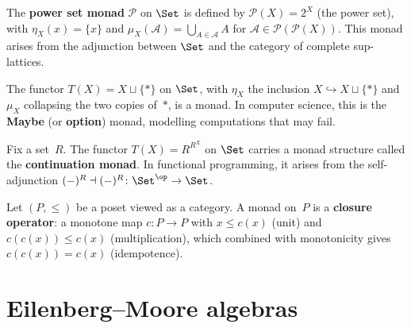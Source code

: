 \begin{example}\label{ex:monad-powerset}
The \textbf{power set monad} $\mathcal{P}$ on $\Set$ is defined by
$\mathcal{P}(X) = 2^X$ (the power set), with
$\eta_X(x) = \{x\}$ and $\mu_X(\mathcal{A}) = \bigcup_{A\in\mathcal{A}} A$
for $\mathcal{A}\in\mathcal{P}(\mathcal{P}(X))$.
This monad arises from the adjunction between $\Set$ and the category
of complete sup-lattices.
\end{example}

\begin{example}\label{ex:monad-maybe}
The functor $T(X) = X\sqcup\{*\}$ on $\Set$, with $\eta_X$ the
inclusion $X\hookrightarrow X\sqcup\{*\}$ and $\mu_X$ collapsing
the two copies of~$*$, is a monad.  In computer science, this is the
\textbf{Maybe} (or \textbf{option}) monad, modelling computations that
may fail.
\end{example}

\begin{example}\label{ex:monad-continuation}
Fix a set~$R$.  The functor $T(X) = R^{R^X}$ on $\Set$ carries a
monad structure called the \textbf{continuation monad}.
In functional programming, it arises from the self-adjunction
$(-)^R\dashv(-)^R\colon\Set^{\op}\to\Set$.
\end{example}

\begin{example}\label{ex:monad-closure}
Let $(P,\leq)$ be a poset viewed as a category.  A monad on~$P$ is a
\textbf{closure operator}: a monotone map $c\colon P\to P$ with
$x\leq c(x)$ (unit) and $c(c(x))\leq c(x)$ (multiplication), which
combined with monotonicity gives $c(c(x)) = c(x)$ (idempotence).
\end{example}


\section{Eilenberg--Moore algebras}\label{sec:em-algebras}

